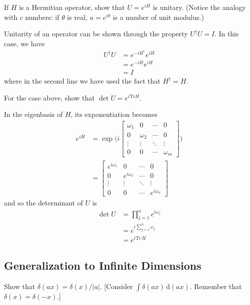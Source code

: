 \documentclass[../principles-of-quantum-mechanics.tex]{subfiles}
\begin{document}
\begin{questions}
\question If $H$ is a Hermitian operator, show that $U=e^{iH}$ is unitary. (Notice the analogy with $c$ numbers: if $\theta$ is real, $u=e^{i\theta}$ is a number of unit modulus.)

\begin{solution}
	Unitarity of an operator can be shown through the property $U^\dagger{U}=I$. In this case, we have
	\begin{align*}
		U^\dagger U &= e^{-iH^\dagger}e^{iH} \\
		&= e^{-iH}e^{iH} \\
		&= I
	\end{align*}
	where in the second line we have used the fact that $H^\dagger = H$.
\end{solution}

\question For the case above, show that $\det{U}=e^{i\mathrm{Tr}H}$.

\begin{solution}
	In the eigenbasis of $H$, its exponentiation becomes
	\begin{align*}
		e^{iH} &= \exp\Big(i\begin{bmatrix}
			\omega_1 & 0 & \cdots & 0 \\
			0 & \omega_2 & \cdots & 0 \\
			\vdots & \vdots & \ddots & \vdots \\
			0 & 0 & \cdots & \omega_m
		\end{bmatrix}\Big) \\
	&= \begin{bmatrix}
		e^{i\omega_1} & 0 & \cdots & 0 \\
		0 & e^{i\omega_2} & \cdots & 0 \\
		\vdots & \vdots & \ddots & \vdots \\
		0 & 0 & \cdots & e^{i\omega_n}
	\end{bmatrix}
	\end{align*}
	and so the determinant of $U$ is
	\begin{align*}
		\det U &= \prod_{j=1}^n e^{i\omega_j} \\
		&= e^{i\sum_{j=1}^n\omega_j} \\
		&= e^{i\mathrm{Tr}\,H}
	\end{align*}
\end{solution}

\setcounter{subsection}{9}
\setcounter{question}{0}
\subsection{Generalization to Infinite Dimensions}
\question Show that $\delta(ax) = \delta(x)/|a|$. [Consider $\int\delta(ax)\,\mathrm{d}(ax)$. Remember that $\delta(x)=\delta(-x)$.]


\end{questions}
\end{document}
